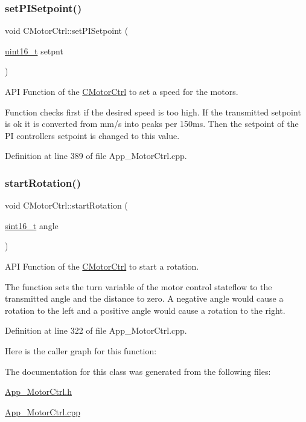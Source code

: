 \subsubsection{\texorpdfstring{setPISetpoint()}{setPISetpoint()}}
{\footnotesize\ttfamily void C\+Motor\+Ctrl\+::set\+P\+I\+Setpoint (\begin{DoxyParamCaption}\item[{\mbox{\hyperlink{_a_d_a_s___types_8h_a1f1825b69244eb3ad2c7165ddc99c956}{uint16\+\_\+t}}}]{setpnt }\end{DoxyParamCaption})}



A\+PI Function of the \mbox{\hyperlink{class_c_motor_ctrl}{C\+Motor\+Ctrl}} to set a speed for the motors. 

Function checks first if the desired speed is too high. If the transmitted setpoint is ok it is converted from mm/s into peaks per 150ms. Then the setpoint of the PI controllers setpoint is changed to this value. 

Definition at line 389 of file App\+\_\+\+Motor\+Ctrl.\+cpp.

\mbox{\label{class_c_motor_ctrl_a1ee991f9511437a2e64ee75161063020}} 
\subsubsection{\texorpdfstring{startRotation()}{startRotation()}}
{\footnotesize\ttfamily void C\+Motor\+Ctrl\+::start\+Rotation (\begin{DoxyParamCaption}\item[{\mbox{\hyperlink{_a_d_a_s___types_8h_ae4c9b951dbb7355563c313abca5e2e75}{sint16\+\_\+t}}}]{angle }\end{DoxyParamCaption})}



A\+PI Function of the \mbox{\hyperlink{class_c_motor_ctrl}{C\+Motor\+Ctrl}} to start a rotation. 

The function sets the turn variable of the motor control stateflow to the transmitted angle and the distance to zero. A negative angle would cause a rotation to the left and a positive angle would cause a rotation to the right. 

Definition at line 322 of file App\+\_\+\+Motor\+Ctrl.\+cpp.

Here is the caller graph for this function\+:


The documentation for this class was generated from the following files\+:\begin{DoxyCompactItemize}
\item 
\mbox{\hyperlink{_app___motor_ctrl_8h}{App\+\_\+\+Motor\+Ctrl.\+h}}\item 
\mbox{\hyperlink{_app___motor_ctrl_8cpp}{App\+\_\+\+Motor\+Ctrl.\+cpp}}\end{DoxyCompactItemize}
